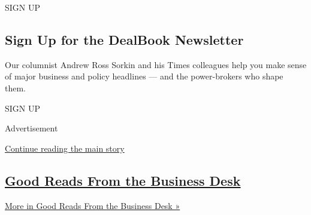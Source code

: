 SIGN UP

\hypertarget{sign-up-for-the-dealbook-newsletter}{%
\subsection{Sign Up for the DealBook
Newsletter}\label{sign-up-for-the-dealbook-newsletter}}

Our columnist Andrew Ross Sorkin and his Times colleagues help you make
sense of major business and policy headlines --- and the power-brokers
who shape them.

SIGN UP

Advertisement

\protect\hyperlink{after-mid1}{Continue reading the main story}

\hypertarget{good-reads-from-the-business-desk}{%
\subsection{\texorpdfstring{\href{/spotlight/editors-picks-business}{Good
Reads From the Business
Desk}}{Good Reads From the Business Desk}}\label{good-reads-from-the-business-desk}}

\href{/spotlight/editors-picks-business}{More in Good Reads From the
Business Desk »}

